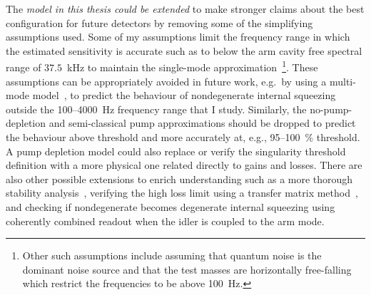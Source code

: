 The \emph{model in this thesis could be extended} to make stronger claims about the best configuration for future detectors by removing some of the simplifying assumptions used.
Some of my assumptions limit the frequency range in which the estimated sensitivity is accurate such as to below the arm cavity free spectral range of $37.5$~kHz to maintain the single-mode approximation~\footnote{Other such assumptions include assuming that quantum noise is the dominant noise source and that the test masses are horizontally free-falling which restrict the frequencies to be above 100~Hz.}. These assumptions can be appropriately avoided in future work, e.g.\ by using a multi-mode model~\cite{liEnhancingInterferometerSensitivity2021}, to predict the behaviour of nondegenerate internal squeezing outside the 100--4000~Hz frequency range that I study.
Similarly, the no-pump-depletion and semi-classical pump approximations should be dropped to predict the behaviour above threshold and more accurately at, e.g., 95--100~$\%$ threshold. A pump depletion model could also replace or verify the singularity threshold definition with a more physical one related directly to gains and losses. 
There are also other possible extensions to enrich understanding such as a more thorough stability analysis~\cite{liEnhancingInterferometerSensitivity2021}, verifying the high loss limit using a transfer matrix method~\cite{}, and checking if nondegenerate becomes degenerate internal squeezing using coherently combined readout when the idler is coupled to the arm mode.


